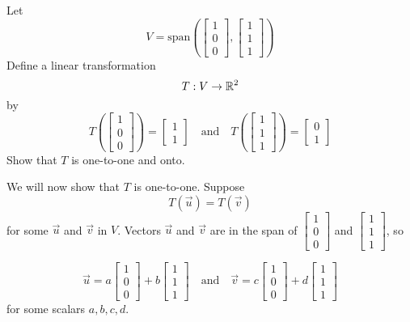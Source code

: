 \documentclass{ximera}
\begin{document}
\begin{example}\label{ex:subtosub} Let $$V=\text{span}\left(\begin{bmatrix}1\\0\\0\end{bmatrix}, \begin{bmatrix}1\\1\\1\end{bmatrix}\right)$$
Define a linear transformation $$T:V\rightarrow \mathbb{R}^2$$
by $$T\left(\begin{bmatrix}1\\0\\0\end{bmatrix}\right)=\begin{bmatrix}1\\1\end{bmatrix}\quad \text{and} \quad T\left(\begin{bmatrix}1\\1\\1\end{bmatrix}\right)=\begin{bmatrix}0\\1\end{bmatrix}$$
Show that $T$ is one-to-one and onto.
\begin{explanation}
We will now show that $T$ is one-to-one.  
Suppose 
$$T(\vec{u})=T(\vec{v})$$
for some $\vec{u}$ and $\vec{v}$ in $V$. Vectors $\vec{u}$ and $\vec{v}$ are in the span of $\begin{bmatrix}1\\0\\0\end{bmatrix}$ and $\begin{bmatrix}1\\1\\1\end{bmatrix}$, so

$$\vec{u}=a\begin{bmatrix}1\\0\\0\end{bmatrix}+b\begin{bmatrix}1\\1\\1\end{bmatrix}\quad\text{and}\quad \vec{v}=c\begin{bmatrix}1\\0\\0\end{bmatrix}+d\begin{bmatrix}1\\1\\1\end{bmatrix}$$
for some scalars $a, b, c, d$.


\end{explanation}
\end{example}
\end{document}
